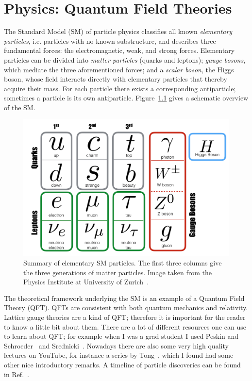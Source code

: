 \chapter{Physics: Quantum Field Theories}

The Standard Model (SM) of particle physics classifies all known
{\it elementary particles}, i.e. particles with no known substructure,
and describes three fundamental forces: the electromagnetic,
weak, and strong forces. Elementary particles can be divided into
{\it matter particles} (quarks and leptons); {\it gauge bosons}, which mediate
the three aforementioned forces; and a {\it scalar boson}, the Higgs boson,
whose field interacts directly with elementary particles that thereby
acquire their mass. For each particle there exists a corresponding
antiparticle; sometimes a particle is its own antiparticle.
Figure~\ref{fig:SM} gives a schematic overview of the SM.

\begin{figure}
  \centering
  \includegraphics[width=0.80\linewidth]{figs/SM.png}
  \caption{Summary of elementary SM particles. The first three columns give
           the three generations of matter particles. Image taken
           from the Physics Institute at University of 
           Zurich~\cite{zurich_SM}.}
  \label{fig:SM}
\end{figure}

The theoretical framework underlying the SM is an example of a Quantum 
Field Theory (QFT). QFTs are consistent with both quantum mechanics and
relativity. Lattice gauge theories are a kind of QFT; therefore it is
important for the reader to know a little bit about them. There are a lot
of different resources one can use to learn about QFT; for example when I was a
grad student I used Peskin and Schroeder~\cite{peskin_introduction_1995}
and Srednicki~\cite{srednicki_quantum_2007}.
Nowadays there are also some very high quality lectures on YouTube,
for instance a series by Tong~\cite{tongQFT}, which I found had some other nice
introductory remarks. 
A timeline of particle discoveries can be found in
Ref.~\cite{wiki_particle_discoveries}.

